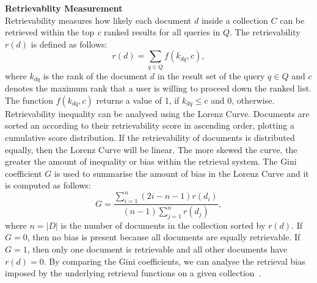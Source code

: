 \textbf{Retrievablity Measurement}
\ \\
Retrievability measures how likely each document $ d $ inside a collection $ C $ can be retrieved within the top \textit{c} ranked results for all queries in $ Q $. The retrievability $ r(d) $ is defined as follows:
\[
r(d)=\sum_{q \in Q}f(k_{dq},c),
\]
where $ k_{dq} $ is the rank of the document $ d $ in the result set of the query $ q \in Q $ and $ c $ denotes the maximum rank that a user is willing to proceed down the ranked list. The function $ f(k_{dq},c) $ returns a value of 1, if $ k_{dq} \leq c $ and 0, otherwise. Retrievability inequality can be analysed using the Lorenz Curve. Documents are sorted an according to their retrievability score in ascending order, plotting a cumulative score distribution. If the retrievability of documents is distributed equally, then the Lorenz Curve will be linear. The more skewed the curve, the greater the amount of inequality or bias within the retrieval system. The Gini coefficient $ G $ is used to summarise the amount of bias in the Lorenz Curve and it is computed as follows:
\begin{equation}
G=\frac{\sum_{i=1}^n(2i-n-1)r(d_{i})}{(n-1)\sum_{j=1}^nr(d_{j})},
\end{equation}
\noindent
where $ n=|D| $ is the number of documents in the collection sorted by $ r(d) $. If $ G=0 $, then no bias is present because all documents are equally retrievable. If $ G=1 $, then only one document is retrievable and all other documents have $ r(d)=0 $. By comparing the Gini coefficients, we can analyse the retrieval bias imposed by the underlying retrieval functions on a given collection~\citep{bashir2011relationship}.
